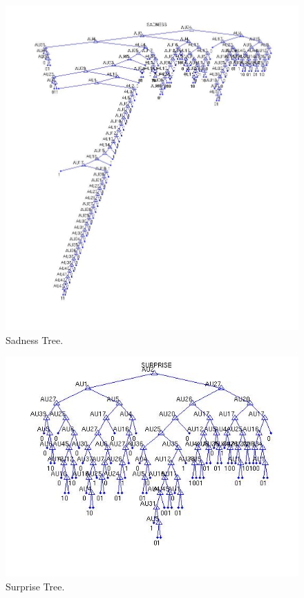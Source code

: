 \documentclass[a4paper,12pt,oneside,final]{report}
\begin{document}
\begin{figure}[!h]
\center
\includegraphics[scale=0.6]{sadness.jpg}
\caption{Sadness Tree.}
\end{figure}

\begin{figure}[!h]
\center
\includegraphics[scale=0.6]{surprise.jpg}
\caption{Surprise Tree.}
\end{figure}
\FloatBarrier
\end{document}

